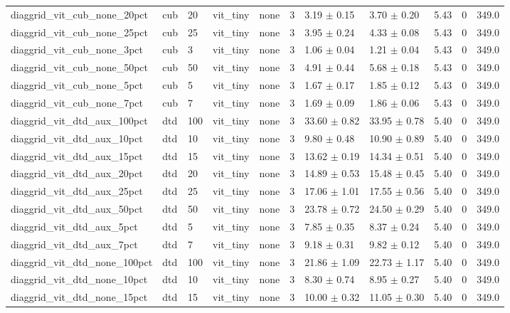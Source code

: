 \begin{tabular}{lllllllllll}
diaggrid_vit_cub_none_20pct & cub & 20 & vit_tiny & none & 3 & 3.19 $\pm$ 0.15 & 3.70 $\pm$ 0.20 & 5.43 & 0 & 349.0 \\
diaggrid_vit_cub_none_25pct & cub & 25 & vit_tiny & none & 3 & 3.95 $\pm$ 0.24 & 4.33 $\pm$ 0.08 & 5.43 & 0 & 349.0 \\
diaggrid_vit_cub_none_3pct & cub & 3 & vit_tiny & none & 3 & 1.06 $\pm$ 0.04 & 1.21 $\pm$ 0.04 & 5.43 & 0 & 349.0 \\
diaggrid_vit_cub_none_50pct & cub & 50 & vit_tiny & none & 3 & 4.91 $\pm$ 0.44 & 5.68 $\pm$ 0.18 & 5.43 & 0 & 349.0 \\
diaggrid_vit_cub_none_5pct & cub & 5 & vit_tiny & none & 3 & 1.67 $\pm$ 0.17 & 1.85 $\pm$ 0.12 & 5.43 & 0 & 349.0 \\
diaggrid_vit_cub_none_7pct & cub & 7 & vit_tiny & none & 3 & 1.69 $\pm$ 0.09 & 1.86 $\pm$ 0.06 & 5.43 & 0 & 349.0 \\
diaggrid_vit_dtd_aux_100pct & dtd & 100 & vit_tiny & none & 3 & 33.60 $\pm$ 0.82 & 33.95 $\pm$ 0.78 & 5.40 & 0 & 349.0 \\
diaggrid_vit_dtd_aux_10pct & dtd & 10 & vit_tiny & none & 3 & 9.80 $\pm$ 0.48 & 10.90 $\pm$ 0.89 & 5.40 & 0 & 349.0 \\
diaggrid_vit_dtd_aux_15pct & dtd & 15 & vit_tiny & none & 3 & 13.62 $\pm$ 0.19 & 14.34 $\pm$ 0.51 & 5.40 & 0 & 349.0 \\
diaggrid_vit_dtd_aux_20pct & dtd & 20 & vit_tiny & none & 3 & 14.89 $\pm$ 0.53 & 15.48 $\pm$ 0.45 & 5.40 & 0 & 349.0 \\
diaggrid_vit_dtd_aux_25pct & dtd & 25 & vit_tiny & none & 3 & 17.06 $\pm$ 1.01 & 17.55 $\pm$ 0.56 & 5.40 & 0 & 349.0 \\
diaggrid_vit_dtd_aux_50pct & dtd & 50 & vit_tiny & none & 3 & 23.78 $\pm$ 0.72 & 24.50 $\pm$ 0.29 & 5.40 & 0 & 349.0 \\
diaggrid_vit_dtd_aux_5pct & dtd & 5 & vit_tiny & none & 3 & 7.85 $\pm$ 0.35 & 8.37 $\pm$ 0.24 & 5.40 & 0 & 349.0 \\
diaggrid_vit_dtd_aux_7pct & dtd & 7 & vit_tiny & none & 3 & 9.18 $\pm$ 0.31 & 9.82 $\pm$ 0.12 & 5.40 & 0 & 349.0 \\
diaggrid_vit_dtd_none_100pct & dtd & 100 & vit_tiny & none & 3 & 21.86 $\pm$ 1.09 & 22.73 $\pm$ 1.17 & 5.40 & 0 & 349.0 \\
diaggrid_vit_dtd_none_10pct & dtd & 10 & vit_tiny & none & 3 & 8.30 $\pm$ 0.74 & 8.95 $\pm$ 0.27 & 5.40 & 0 & 349.0 \\
diaggrid_vit_dtd_none_15pct & dtd & 15 & vit_tiny & none & 3 & 10.00 $\pm$ 0.32 & 11.05 $\pm$ 0.30 & 5.40 & 0 & 349.0 \\

\end{tabular}
